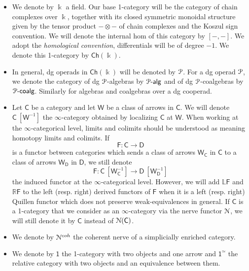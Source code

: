 \documentclass{proc-l}
\renewcommand{\mathcal}{\EuScript}
\theoremstyle{plain}
\theoremstyle{definition}
\theoremstyle{remark}
\newcommand{\kk}{\Bbbk}
\begin{document}
\begin{itemize}
\item We denote by $\kk$ a field. Our base 1-category will be the category of chain complexes over $\kk$, together with its closed symmetric monoidal structure given by the tensor product $-\otimes-$ of chain complexes and the Koszul sign convention. We will denote the internal hom of this category by $[-,-]$. We adopt the \textit{homological convention}, differentials will be of degree $-1$. We denote this 1-category by $\mathsf{Ch}(\kk)$.

\item In general, dg operads in $\mathsf{Ch}(\kk)$ will be denoted by $\mathcal{P}$. For a dg operad $\mathcal{P}$, we denote the category of dg $\mathcal{P}$-algebras by $\mathcal{P}\text{-}\mathsf{alg}$ and of dg $\mathcal{P}$-coalgebras by $\mathcal{P}\text{-}\mathsf{coalg}$. Similarly for algebras and coalgebras over a dg cooperad.

\item Let $\mathsf{C}$ be a category and let $\mathsf{W}$ be a class of arrows in $\mathsf{C}$. We will denote $\mathsf{C}~[\mathsf{W}^{-1}]$ the $\infty$-category obtained by localizing $\mathsf{C}$ at $\mathsf{W}$. When working at the $\infty$-categorical level, limits and colimits should be understood as meaning homotopy limits and colimits. If
\[
\mathsf{F}: \mathsf{C} \longrightarrow \mathsf{D}
\]
is a functor between categories which sends a class of arrows $\mathsf{W}_{\mathsf{C}}$ in $\mathsf{C}$ to a class of arrows $\mathsf{W}_{\mathsf{D}}$ in $\mathsf{D}$, we still denote
\[
\mathsf{F}: \mathsf{C}~[\mathsf{W}^{-1}_{\mathsf{C}}] \longrightarrow \mathsf{D}~[\mathsf{W}^{-1}_{\mathsf{D}}]
\]
the induced functor at the $\infty$-categorical level. However, we will add $\mathbb{L}\mathsf{F}$ and $\mathbb{R}\mathsf{F}$ to the left (resp. right) derived functors of $\mathsf{F}$ when it is a left (resp. right) Quillen functor which does not preserve weak-equivalences in general. If $\mathsf{C}$ is a 1-category that we consider as an $\infty$-category via the nerve functor $\mathcal{N}$, we will still denote it by $\mathsf{C}$ instead of $\mathcal{N}(\mathsf{C})$.

\item We denote by $\mathcal{N}^{coh}$ the coherent nerve of a simplicially enriched category.

\item We denote by $\mathsf{1}$ the 1-category with two objects and one arrow and $\mathsf{1}^{\simeq}$ the relative category with two objects and an equivalence between them.


\end{itemize}
\end{document}
